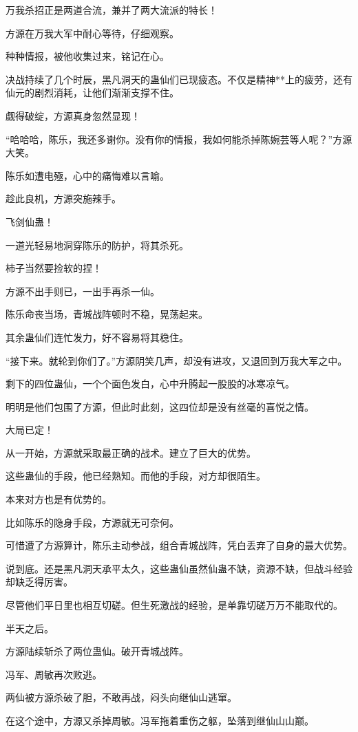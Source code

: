 \begin{this_body}
万我杀招正是两道合流，兼并了两大流派的特长！

方源在万我大军中耐心等待，仔细观察。

种种情报，被他收集过来，铭记在心。

决战持续了几个时辰，黑凡洞天的蛊仙们已现疲态。不仅是精神**上的疲劳，还有仙元的剧烈消耗，让他们渐渐支撑不住。

觑得破绽，方源真身忽然显现！

“哈哈哈，陈乐，我还多谢你。没有你的情报，我如何能杀掉陈婉芸等人呢？”方源大笑。

陈乐如遭电殛，心中的痛悔难以言喻。

趁此良机，方源突施辣手。

飞剑仙蛊！

一道光轻易地洞穿陈乐的防护，将其杀死。

柿子当然要捡软的捏！

方源不出手则已，一出手再杀一仙。

陈乐命丧当场，青城战阵顿时不稳，晃荡起来。

其余蛊仙们连忙发力，好不容易将其稳住。

“接下来。就轮到你们了。”方源阴笑几声，却没有进攻，又退回到万我大军之中。

剩下的四位蛊仙，一个个面色发白，心中升腾起一股股的冰寒凉气。

明明是他们包围了方源，但此时此刻，这四位却是没有丝毫的喜悦之情。

大局已定！

从一开始，方源就采取最正确的战术。建立了巨大的优势。

这些蛊仙的手段，他已经熟知。而他的手段，对方却很陌生。

本来对方也是有优势的。

比如陈乐的隐身手段，方源就无可奈何。

可惜遭了方源算计，陈乐主动参战，组合青城战阵，凭白丢弃了自身的最大优势。

说到底。还是黑凡洞天承平太久，这些蛊仙虽然仙蛊不缺，资源不缺，但战斗经验却缺乏得厉害。

尽管他们平日里也相互切磋。但生死激战的经验，是单靠切磋万万不能取代的。

半天之后。

方源陆续斩杀了两位蛊仙。破开青城战阵。

冯军、周敏再次败逃。

两仙被方源杀破了胆，不敢再战，闷头向继仙山逃窜。

在这个途中，方源又杀掉周敏。冯军拖着重伤之躯，坠落到继仙山山巅。


\end{this_body}
